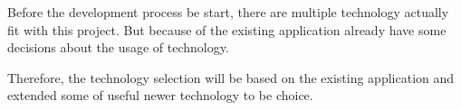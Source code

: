 Before the development process be start, there are multiple technology
actually fit with this project. But because of the existing application
already have some decisions about the usage of technology.

Therefore, the technology selection will be based on the existing application
and extended some of useful newer technology to be choice.